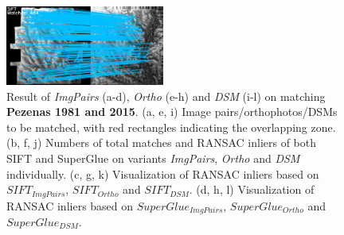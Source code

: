 \begin{figure}[htbp]
\begin{center}
{\begin{minipage}[t]{0.48\linewidth}
				\centering
				\includegraphics[width=5.2cm]{images/Chapitre3/Homol-SIFT2Step-Rough-2DRANSAC_MEC-Malt_Tapas_1981_MEC-Malt_2015.png}
			\end{minipage}%
		}
		\caption{{ Result of \textit{ImgPairs} (a-d), \textit{Ortho} (e-h) and \textit{DSM} (i-l) on matching \textbf{Pezenas 1981 and 2015}. (a, e, i) Image pairs/orthophotos/DSMs to be matched, with red rectangles indicating the overlapping zone. (b, f, j) Numbers of total matches and RANSAC inliers of both SIFT and SuperGlue on variants \textit{ImgPairs}, \textit{Ortho} and \textit{DSM} individually. (c, g, k) Visualization of RANSAC inliers based on $SIFT_{ImgPairs}$, $SIFT_{Ortho}$ and $SIFT_{DSM}$. (d, h, l) Visualization of RANSAC inliers based on $SuperGlue_{ImgPairs}$, $SuperGlue_{Ortho}$ and $SuperGlue_{DSM}$.}}        
		\label{MatchVizPezenas1981DSM}
	\end{center}
\end{figure} 



